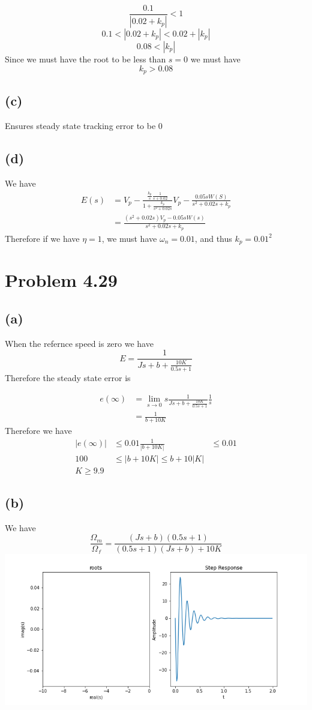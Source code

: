 \documentclass[12pt]{article}
\begin{document}
$$\frac{0.1}{|0.02+k_p|}<1$$
$$0.1<|0.02+k_p|<0.02+|k_p|$$
$$0.08<|k_p|$$
Since we must have the root to be less than $s=0$ we must have
$$\boxed{k_p>0.08}$$
\subsection*{(c)}
Ensures steady state tracking error to be $0$
\subsection*{(d)}
We have
\begin{align*}
    E(s)&=V_p-\frac{\frac{k_p}{s}\frac{1}{s+0.02}}{1+\frac{k_p}{s^2+0.02s}}
V_p-\frac{0.05sW(S)}{s^2+0.02s+k_p}\\
&=\frac{(s^2+0.02s)V_p-0.05sW(s)}{s^2+0.02s+k_p}
\end{align*}
Therefore if we have $\eta=1$, we must have $\omega_n=0.01$, and thus $\boxed{k_p=0.01^2}$
\section*{Problem 4.29}
\subsection*{(a)}
When the refernce speed is zero we have
$$E=\frac{1}{Js+b+\frac{10K}{0.5s+1}}$$
Therefore the steady state error is

\begin{align*}
    e(\infty)&=\lim_{s\to0}s\frac{1}{Js+b+\frac{10K}{0.5s+1}}\frac{1}{s}\\
    &=\frac{1}{b+10K}
\end{align*}
Therefore we have
\begin{align*}
    |e(\infty)|&\leq 0.01
    \frac{1}{|b+10K|}&\leq 0.01\\
    100&\leq|b+10K|\leq b+10|K|\\
    \boxed{K\geq 9.9}
\end{align*}
\subsection*{(b)}
We have
$$\frac{\Omega_m}{\Omega_f}=\frac{(Js+b)(0.5s+1)}{(0.5s+1)(Js+b)+10K}$$
\includegraphics[scale=0.5]{fig1}
\FloatBarrier
\end{document}
